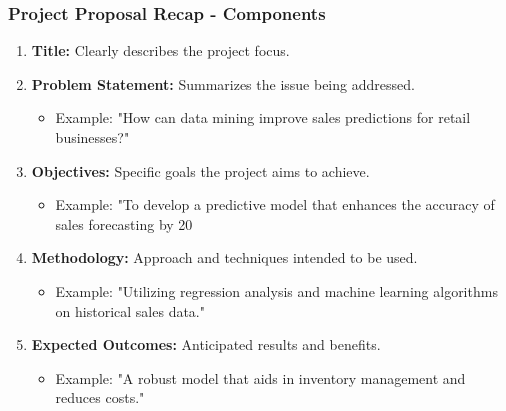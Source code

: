 \documentclass[aspectratio=169]{beamer}
\begin{document}
\begin{frame}[fragile]
    \frametitle{Project Proposal Recap - Components}
    \begin{enumerate}
        \item \textbf{Title:} Clearly describes the project focus.
        \item \textbf{Problem Statement:} Summarizes the issue being addressed. 
        \begin{itemize}
            \item Example: "How can data mining improve sales predictions for retail businesses?"
        \end{itemize}
        \item \textbf{Objectives:} Specific goals the project aims to achieve. 
        \begin{itemize}
            \item Example: "To develop a predictive model that enhances the accuracy of sales forecasting by 20%
        \end{itemize}
        \item \textbf{Methodology:} Approach and techniques intended to be used.
        \begin{itemize}
            \item Example: "Utilizing regression analysis and machine learning algorithms on historical sales data."
        \end{itemize}
        \item \textbf{Expected Outcomes:} Anticipated results and benefits.
        \begin{itemize}
            \item Example: "A robust model that aids in inventory management and reduces costs."
        \end{itemize}
    \end{enumerate}
\end{frame}
\end{document}
